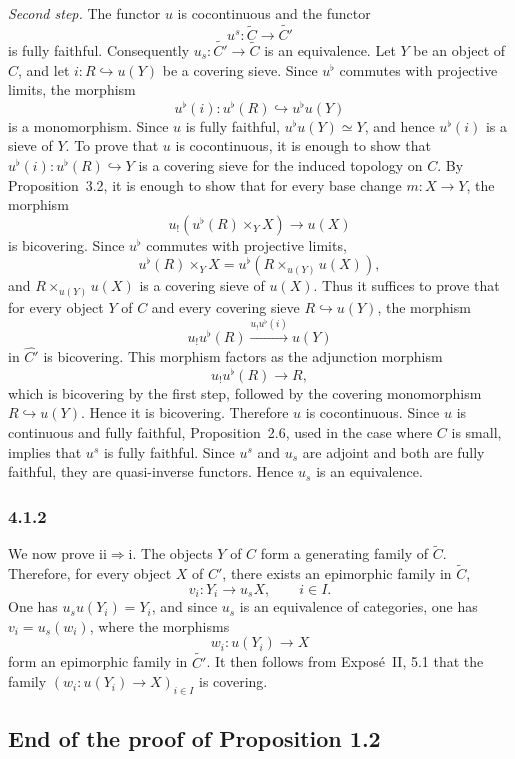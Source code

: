 \documentclass[11pt]{article}
\begin{document}
\emph{Second step.} The functor \(u\) is cocontinuous and the functor
\[
u^s:\widetilde C\to\widetilde{C'}
\]
is fully faithful. Consequently \(u_s:\widetilde{C'}\to\widetilde C\) is an equivalence. Let \(Y\) be an object of \(C\), and let \(i:R\hookrightarrow u(Y)\) be a covering sieve. Since \(u^\flat\) commutes with projective limits, the morphism
\[
u^\flat(i):u^\flat(R)\hookrightarrow u^\flat u(Y)
\]
is a monomorphism. Since \(u\) is fully faithful, \(u^\flat u(Y)\simeq Y\), and hence \(u^\flat(i)\) is a sieve of \(Y\). To prove that \(u\) is cocontinuous, it is enough to show that \(u^\flat(i):u^\flat(R)\hookrightarrow Y\) is a covering sieve for the induced topology on \(C\). By Proposition~3.2, it is enough to show that for every base change \(m:X\to Y\), the morphism
\[
u_!(u^\flat(R)\times_YX)\to u(X)
\]
is bicov\-ering. Since \(u^\flat\) commutes with projective limits,
\[
u^\flat(R)\times_YX=u^\flat(R\times_{u(Y)}u(X)),
\]
and \(R\times_{u(Y)}u(X)\) is a covering sieve of \(u(X)\). Thus it suffices to prove that for every object \(Y\) of \(C\) and every covering sieve \(R\hookrightarrow u(Y)\), the morphism
\[
u_!u^\flat(R)\xrightarrow{u_!u^\flat(i)}u(Y)
\]
in \(\widehat{C'}\) is bicov\-ering. This morphism factors as the adjunction morphism
\[
u_!u^\flat(R)\to R,
\]
which is bicov\-ering by the first step, followed by the covering monomorphism \(R\hookrightarrow u(Y)\). Hence it is bicov\-ering. Therefore \(u\) is cocontinuous. Since \(u\) is continuous and fully faithful, Proposition~2.6, used in the case where \(C\) is small, implies that \(u^s\) is fully faithful. Since \(u^s\) and \(u_s\) are adjoint and both are fully faithful, they are quasi-inverse functors. Hence \(u_s\) is an equivalence.

\subsubsection*{4.1.2}
We now prove \(\mathrm{ii}\Rightarrow\mathrm{i}\). The objects \(Y\) of \(C\) form a generating family of \(\widetilde C\). Therefore, for every object \(X\) of \(C'\), there exists an epimorphic family in \(\widetilde C\),
\[
v_i:Y_i\to u_sX,
\qquad i\in I.
\]
One has \(u_su(Y_i)=Y_i\), and since \(u_s\) is an equivalence of categories, one has \(v_i=u_s(w_i)\), where the morphisms
\[
w_i:u(Y_i)\to X
\]
form an epimorphic family in \(\widetilde{C'}\). It then follows from Expos\'e~II, 5.1 that the family \((w_i:u(Y_i)\to X)_{i\in I}\) is covering.

\subsection{End of the proof of Proposition 1.2}
\end{document}

